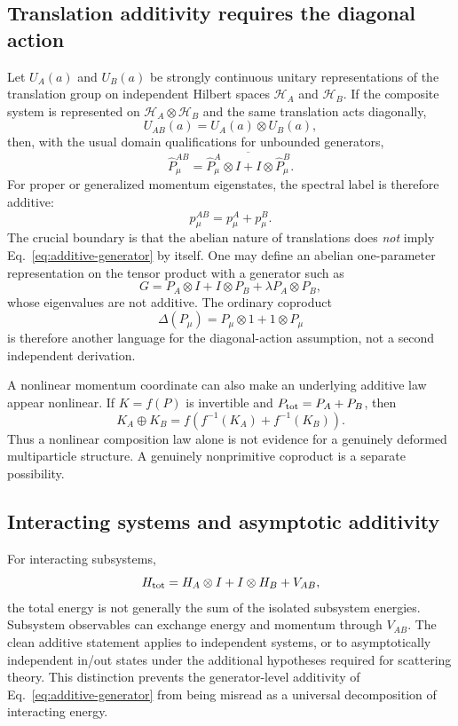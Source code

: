 \documentclass[11pt,a4paper]{article}
\begin{document}
\subsection{Translation additivity requires the diagonal action}
Let $U_A(a)$ and $U_B(a)$ be strongly continuous unitary representations of the translation group on independent Hilbert spaces $\mathcal H_A$ and $\mathcal H_B$.  If the composite system is represented on $\mathcal H_A\otimes\mathcal H_B$ and the same translation acts diagonally,
\begin{equation}
U_{AB}(a)=U_A(a)\otimes U_B(a),
\end{equation}
then, with the usual domain qualifications for unbounded generators,
\begin{equation}
\boxed{\hat P^{AB}_\mu=
\overline{\hat P^A_\mu\otimes I+I\otimes \hat P^B_\mu}}.
\label{eq:additive-generator}
\end{equation}
For proper or generalized momentum eigenstates, the spectral label is therefore additive:
\begin{equation}
p^{AB}_\mu=p^A_\mu+p^B_\mu.
\end{equation}
The crucial boundary is that the abelian nature of translations does \emph{not} imply Eq.~\eqref{eq:additive-generator} by itself.  One may define an abelian one-parameter representation on the tensor product with a generator such as
\begin{equation}
G=P_A\otimes I+I\otimes P_B+\lambda P_A\otimes P_B,
\end{equation}
whose eigenvalues are not additive.  The ordinary coproduct
\begin{equation}
\Delta(P_\mu)=P_\mu\otimes 1+1\otimes P_\mu
\end{equation}
is therefore another language for the diagonal-action assumption, not a second independent derivation.

A nonlinear momentum coordinate can also make an underlying additive law appear nonlinear.  If $K=f(P)$ is invertible and $P_{\rm tot}=P_A+P_B$, then
\begin{equation}
K_A\oplus K_B=f\!\left(f^{-1}(K_A)+f^{-1}(K_B)\right).
\end{equation}
Thus a nonlinear composition law alone is not evidence for a genuinely deformed multiparticle structure.  A genuinely nonprimitive coproduct is a separate possibility.

\subsection{Interacting systems and asymptotic additivity}
For interacting subsystems,
\begin{equation}
H_{\rm tot}=H_A\otimes I+I\otimes H_B+V_{AB},
\end{equation}
the total energy is not generally the sum of the isolated subsystem energies.  Subsystem observables can exchange energy and momentum through $V_{AB}$.  The clean additive statement applies to independent systems, or to asymptotically independent in/out states under the additional hypotheses required for scattering theory.  This distinction prevents the generator-level additivity of Eq.~\eqref{eq:additive-generator} from being misread as a universal decomposition of interacting energy.
\end{document}

